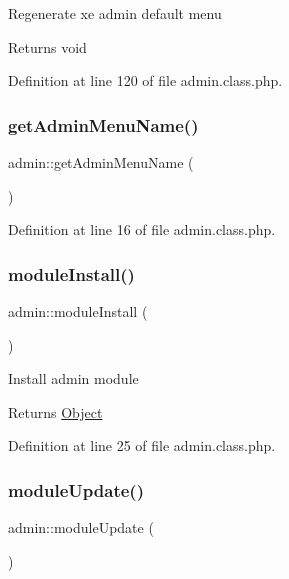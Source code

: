 Regenerate xe admin default menu \begin{DoxyReturn}{Returns}
void 
\end{DoxyReturn}


Definition at line 120 of file admin.\+class.\+php.

\hypertarget{classadmin_ad380bb9d26a45cb880a7bfd94ea5aa03}{}\label{classadmin_ad380bb9d26a45cb880a7bfd94ea5aa03} 
\subsubsection{\texorpdfstring{get\+Admin\+Menu\+Name()}{getAdminMenuName()}}
{\footnotesize\ttfamily admin\+::get\+Admin\+Menu\+Name (\begin{DoxyParamCaption}{ }\end{DoxyParamCaption})}



Definition at line 16 of file admin.\+class.\+php.

\hypertarget{classadmin_abd41ac19cf93c34fb1524aafac45c76e}{}\label{classadmin_abd41ac19cf93c34fb1524aafac45c76e} 
\subsubsection{\texorpdfstring{module\+Install()}{moduleInstall()}}
{\footnotesize\ttfamily admin\+::module\+Install (\begin{DoxyParamCaption}{ }\end{DoxyParamCaption})}

Install admin module \begin{DoxyReturn}{Returns}
\hyperlink{classObject}{Object} 
\end{DoxyReturn}


Definition at line 25 of file admin.\+class.\+php.

\hypertarget{classadmin_a57ea73a68677930fd02b4ad0f29a9549}{}\label{classadmin_a57ea73a68677930fd02b4ad0f29a9549} 
\subsubsection{\texorpdfstring{module\+Update()}{moduleUpdate()}}
{\footnotesize\ttfamily admin\+::module\+Update (\begin{DoxyParamCaption}{ }\end{DoxyParamCaption})}

